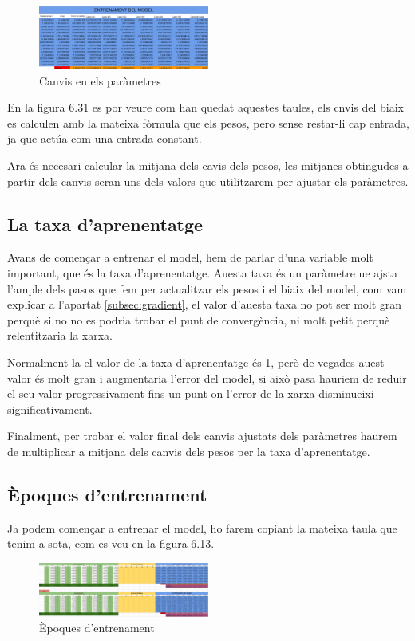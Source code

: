 \begin{figure}[H]
    \centering
    \includegraphics[width=0.5\textwidth]{./figures/Canvis.png}
    \caption{Canvis en els paràmetres}
\end{figure}

En la figura 6.31 es por veure com han quedat aquestes taules, els cnvis del biaix es calculen amb la mateixa fòrmula que els pesos, pero sense restar-li cap entrada, ja que actúa com una entrada constant.

Ara és necesari calcular la mitjana dels cavis dels pesos, les mitjanes obtingudes a partir dels canvis seran uns dels valors que utilitzarem per ajustar els paràmetres.

\subsection{La taxa d'aprenentatge}
Avans de començar a entrenar el model, hem de parlar d'una variable molt important, que és la taxa d'aprenentatge. Auesta taxa és un paràmetre ue ajsta l'ample dels pasos que fem per actualitzar els pesos i el biaix del model, com vam explicar a l'apartat \ref{subsec:gradient}, el valor d'auesta taxa no pot ser molt gran perquè si no no es podria trobar el punt de convergència, ni molt petit perquè relentitzaria la xarxa.

Normalment la el valor de la taxa d'aprenentatge és 1, però de vegades auest valor és molt gran i augmentaria l'error del model, si això pasa hauriem de reduir el seu valor progressivament fins un punt on l'error de la xarxa disminueixi significativament.

Finalment, per trobar el valor final dels canvis ajustats dels paràmetres haurem de multiplicar a mitjana dels canvis dels pesos per la taxa d'aprenentatge.
\subsection{Èpoques d'entrenament}
Ja podem començar a entrenar el model, ho farem copiant la mateixa taula que tenim a sota, com es veu en la figura 6.13.

\begin{figure}[H]
    \centering
    \includegraphics[width=0.5\textwidth]{./figures/Etapa_1.png}
    \caption{Èpoques d'entrenament}
\end{figure}

